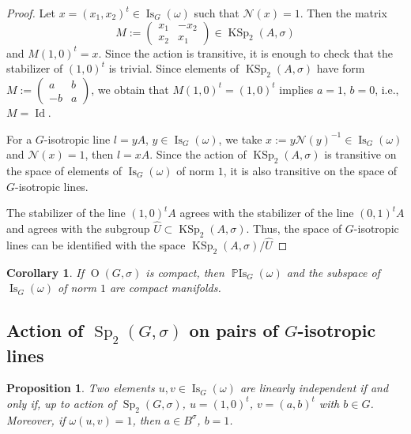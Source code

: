 \documentclass[a4paper,oneside,11pt]{amsart}
\DeclareMathOperator{\Id}{Id}
\DeclareMathOperator{\Sp}{Sp}
\DeclareMathOperator{\OO}{O}
\DeclareMathOperator{\KSp}{KSp}
\DeclareMathOperator{\Is}{Is}
\DeclareMathOperator{\PIs}{\mathbb{P}Is}
\theoremstyle{plain}
\newtheorem{cor}[teo]{Corollary}
\newtheorem{prop}[teo]{Proposition}
\theoremstyle{definition}
\theoremstyle{remark}
\begin{document}
\begin{proof}
    Let $x=(x_1,x_2)^t\in\Is_G(\omega)$ such that $\mathcal N(x)=1$. Then the matrix 
    $$M:=\begin{pmatrix}
        x_1 & -x_2\\
        x_2 & x_1
    \end{pmatrix}\in \KSp_2(A,\sigma)$$
    and $M(1,0)^t=x$. Since the action is transitive, it is enough to check that the stabilizer of $(1,0)^t$ is trivial. Since elements of $\KSp_2(A,\sigma)$ have form $M:=\begin{pmatrix}
        a & b \\
        -b & a
    \end{pmatrix}$, we obtain that $M(1,0)^t=(1,0)^t$ implies $a=1$, $b=0$, i.e., $M=\Id$.

    For a $G$-isotropic line $l=yA$, $y\in\Is_G(\omega)$, we take $x:=y\mathcal N(y)^{-1}\in \Is_G(\omega)$ and $\mathcal N(x)=1$, then $l=xA$. Since the action of $\KSp_2(A,\sigma)$ is transitive on the space of elements of $\Is_G(\omega)$ of norm $1$, it is also transitive on the space of $G$-isotropic lines.

    The stabilizer of the line $(1,0)^tA$ agrees with the stabilizer of the line $(0,1)^tA$ and agrees with the subgroup $\hat U\subset \KSp_2(A,\sigma)$. Thus, the space of $G$-isotropic lines can be identified with the space $\KSp_2(A,\sigma)/\hat U$
\end{proof}

\begin{cor}
    If $\OO(G,\sigma)$ is compact, then $\PIs_G(\omega)$ and the subspace of $\Is_G(\omega)$ of norm $1$ are compact manifolds.
\end{cor}

\subsection{Action of \texorpdfstring{$\Sp_2(G,\sigma)$}{Sp2(G,sigma)} on pairs of \texorpdfstring{$G$}{G}-isotropic lines}


\begin{prop}
Two elements $u,v\in\Is_G(\omega)$ are linearly independent if and only if, up to action of $\Sp_2(G,\sigma)$, $u=(1,0)^t$, $v=(a,b)^t$ with $b\in G$. Moreover, if $\omega(u,v)=1$, then $a\in B^{\sigma}$, $b=1$.
\end{prop}
\end{document}
